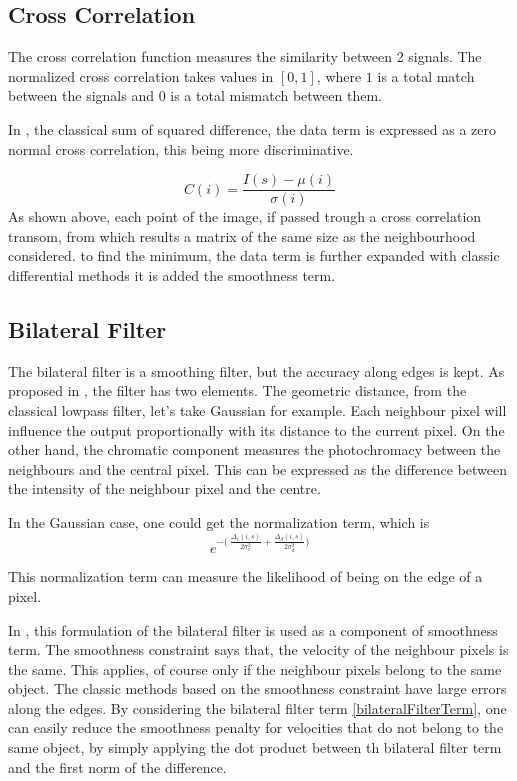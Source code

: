 \documentclass[12pt,a4paper,twoside]{report}
\begin{document}
\subsection{Cross Correlation}
The cross correlation function measures the similarity between 2 signals.
The normalized cross correlation takes values in $[0,1]$, where $1$ is a total match between the signals and $0$ is a total mismatch between them.

In \cite{drulea2013}, the classical sum of squared difference, the data term is expressed as a zero normal cross correlation, this being more discriminative. 
 
 \begin{equation}
 C(i) = \frac{I(s)- \mu(i)}{\sigma(i)}
 \end{equation}
As shown above, each point of the image, if passed trough a cross correlation transom, from which results a matrix of the same size as the neighbourhood considered. to find the minimum, the data term is further expanded with classic differential methods it is added the smoothness term.

\subsection{Bilateral Filter}
The bilateral filter is a smoothing filter, but the accuracy along edges is kept. 
As proposed in \cite{tomasi1998bilateral}, the filter has two elements. The geometric distance, from the classical lowpass filter, let's take Gaussian for example. Each neighbour pixel will influence the output proportionally with its distance to the current pixel. On the other hand, the chromatic component measures the photochromacy between the neighbours and the central pixel. This can be expressed as the difference between the intensity of the neighbour pixel and the centre. 

In the Gaussian case, one could get the normalization term, which is
\begin{equation} \label{bilateralFilterTerm}
	e^{-\big(\ \frac{\Delta_c(i,s)}{2\sigma_c^2}+ \frac{\Delta_d(i,s)}{2\sigma_d^2}\big)}
\end{equation}

This normalization term can measure the likelihood of being on the edge of a pixel. 

In \cite{drulea2013}, this formulation of the bilateral filter is used as a component of smoothness term. The smoothness constraint says that, the velocity of the neighbour pixels is the same. This applies, of course only if the neighbour pixels belong to the same object. The classic methods based on the smoothness constraint have large errors along the edges. By considering the bilateral filter term \ref{bilateralFilterTerm}, one can easily reduce the smoothness penalty for velocities that do not belong to the same object, by simply applying the dot product between th bilateral filter term and the first norm of the difference. 
\end{document}
